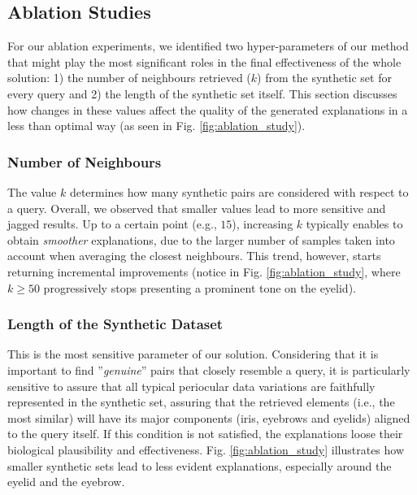 \documentclass[final]{cvpr}
\begin{document}
\subsection{Ablation Studies}
\label{subsec:ablation_study}
For our ablation experiments, we identified two hyper-parameters of our method that might play the most significant roles in the final effectiveness of the whole solution: 1) the number of neighbours retrieved ($k$) from the synthetic set for every query and 2) the length of the synthetic set itself. This section discusses how changes in these values affect the quality of the generated explanations in a less than optimal way (as seen in Fig. \ref{fig:ablation_study}).

\subsubsection{Number of Neighbours}
\label{subsubsec:number_of_closest_neighbours}
The value $k$ determines how many synthetic pairs are considered with respect to a query. Overall, we observed that smaller values lead to more sensitive and jagged results. Up to a certain point (e.g., $15$), increasing $k$ typically enables to obtain \emph{smoother} explanations, due to the larger number of samples taken into account when averaging the closest neighbours. This trend, however, starts returning incremental improvements (notice in Fig. \ref{fig:ablation_study}, where $k\geq50$  progressively stops presenting a prominent tone on the eyelid).

\subsubsection{Length of the Synthetic Dataset}
\label{subsubsec:synthetic_dataset_length}

This is the most sensitive parameter of our solution. Considering that it is important to find ''\emph{genuine}'' pairs that closely resemble a query, it is particularly sensitive to assure that all typical periocular data variations are faithfully represented in the synthetic set, assuring that the retrieved elements (i.e., the most similar) will have its major components (iris, eyebrows and eyelids) aligned to the query itself. If this condition is not satisfied, the explanations loose their biological plausibility and effectiveness.
Fig. \ref{fig:ablation_study} illustrates how smaller synthetic sets lead to less evident explanations, especially around the eyelid and the eyebrow. 
\end{document}
